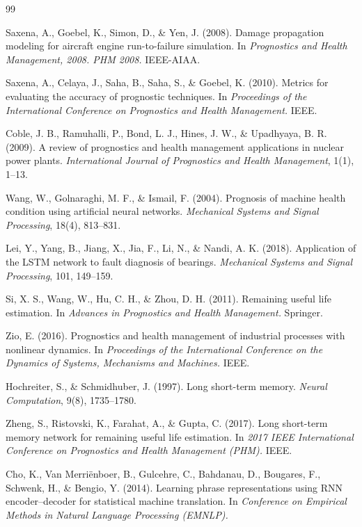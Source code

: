 \documentclass[letterpaper]{article}
\begin{document}
\begin{thebibliography}{99}

 Saxena, A., Goebel, K., Simon, D., \& Yen, J. (2008). Damage propagation modeling for aircraft engine run-to-failure simulation. In \textit{Prognostics and Health Management, 2008. PHM 2008.} IEEE-AIAA.

 Saxena, A., Celaya, J., Saha, B., Saha, S., \& Goebel, K. (2010). Metrics for evaluating the accuracy of prognostic techniques. In \textit{Proceedings of the International Conference on Prognostics and Health Management.} IEEE.

 Coble, J. B., Ramuhalli, P., Bond, L. J., Hines, J. W., \& Upadhyaya, B. R. (2009). A review of prognostics and health management applications in nuclear power plants. \textit{International Journal of Prognostics and Health Management}, 1(1), 1--13.

 Wang, W., Golnaraghi, M. F., \& Ismail, F. (2004). Prognosis of machine health condition using artificial neural networks. \textit{Mechanical Systems and Signal Processing}, 18(4), 813--831.

 Lei, Y., Yang, B., Jiang, X., Jia, F., Li, N., \& Nandi, A. K. (2018). Application of the LSTM network to fault diagnosis of bearings. \textit{Mechanical Systems and Signal Processing}, 101, 149--159.

 Si, X. S., Wang, W., Hu, C. H., \& Zhou, D. H. (2011). Remaining useful life estimation. In \textit{Advances in Prognostics and Health Management.} Springer.

 Zio, E. (2016). Prognostics and health management of industrial processes with nonlinear dynamics. In \textit{Proceedings of the International Conference on the Dynamics of Systems, Mechanisms and Machines.} IEEE.

 Hochreiter, S., \& Schmidhuber, J. (1997). Long short-term memory. \textit{Neural Computation}, 9(8), 1735--1780.

 Zheng, S., Ristovski, K., Farahat, A., \& Gupta, C. (2017). Long short-term memory network for remaining useful life estimation. In \textit{2017 IEEE International Conference on Prognostics and Health Management (PHM).} IEEE.

 Cho, K., Van Merri{\"e}nboer, B., Gulcehre, C., Bahdanau, D., Bougares, F., Schwenk, H., \& Bengio, Y. (2014). Learning phrase representations using RNN encoder--decoder for statistical machine translation. In \textit{Conference on Empirical Methods in Natural Language Processing (EMNLP).}


\end{thebibliography}
\end{document}
